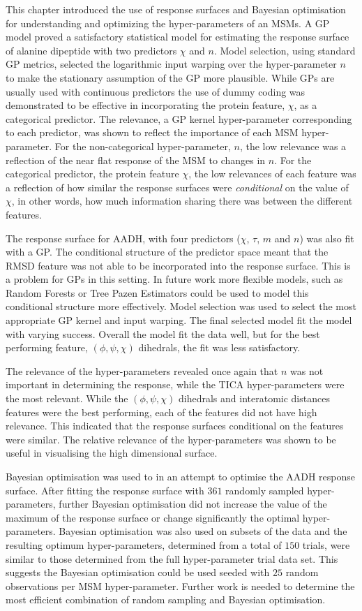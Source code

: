 This chapter introduced the use of response surfaces and Bayesian optimisation for understanding and optimizing the hyper-parameters of an MSMs. A GP model proved a satisfactory statistical model for estimating the response surface of alanine dipeptide with two predictors $\chi$ and $n$. Model selection, using standard GP metrics, selected the logarithmic input warping over the hyper-parameter $n$ to make the stationary assumption of the GP more plausible.  While GPs are usually used with continuous predictors the use of dummy coding  was demonstrated to be effective in incorporating the protein feature, $\chi$, as a categorical predictor. The relevance, a GP kernel hyper-parameter corresponding to each predictor,  was shown to reflect the importance of each  MSM hyper-parameter. For the non-categorical hyper-parameter, $n$, the low relevance was a reflection of the near flat response of the MSM to changes in $n$. For the categorical predictor, the protein feature $\chi$, the low relevances of each feature was a reflection of how similar the response surfaces were \emph{conditional} on the value of $\chi$, in other words, how much information sharing there was between the different features. 

The response surface for AADH, with four predictors ($\chi$, $\tau$, $m$ and $n$) was also fit with a GP. The conditional structure of the predictor space meant that the RMSD feature was not able to be incorporated into the response surface. This is a problem for GPs in this setting. In future work more flexible models, such as Random Forests or Tree Pazen Estimators could be used to model this conditional structure more effectively. Model selection was used to select the most appropriate GP kernel and input warping. The final selected model fit the model with varying success. Overall the model fit the data well, but for the best performing feature, $(\phi, \psi, \chi)$ dihedrals, the fit was less satisfactory. 

The relevance of the hyper-parameters revealed once again that $n$ was not important in determining the response, while the TICA hyper-parameters were the most relevant. While the $(\phi, \psi, \chi)$ dihedrals and interatomic distances features were the best performing, each of the features did not have high relevance. This indicated that the response surfaces conditional on the features were similar.  The relative relevance of the hyper-parameters was shown to be useful in visualising the high dimensional surface.

Bayesian optimisation was used to in an attempt to optimise the AADH response surface. After fitting the response surface with $361$ randomly sampled hyper-parameters, further Bayesian optimisation did not increase the value of the maximum of the response surface or change significantly the optimal hyper-parameters. Bayesian optimisation was also used on subsets of the data and the resulting optimum hyper-parameters, determined from a total of $150$ trials, were similar to those determined from the full hyper-parameter trial data set. This suggests the Bayesian optimisation could be used seeded with $25$ random observations per MSM hyper-parameter. Further work is needed to determine the most efficient combination of random sampling and Bayesian optimisation. 

